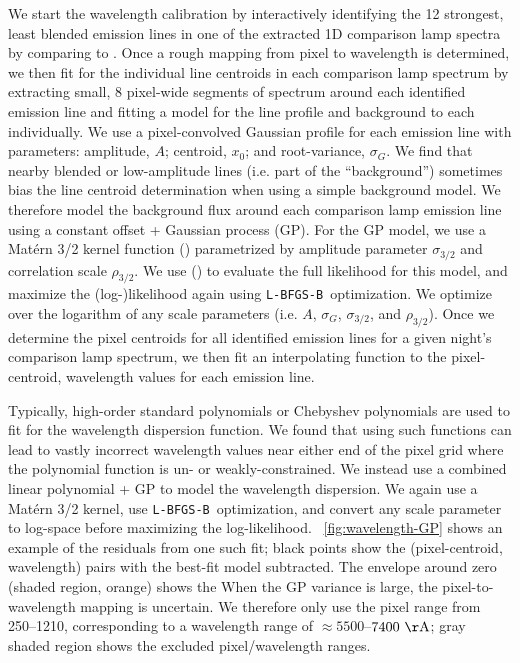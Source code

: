 \documentclass[modern, letterpaper]{aastex61}
\newcommand{\lbfgsb}{\texttt{L-BFGS-B}}
\begin{document}
We start the wavelength calibration by interactively identifying the 12
strongest, least blended emission lines in one of the extracted 1D comparison
lamp spectra by comparing to .
Once a rough mapping from pixel to wavelength is determined, we then fit for
the individual line centroids in each comparison lamp spectrum by extracting
small, 8 pixel-wide segments of spectrum around each identified emission line
and fitting a model for the line profile and background to each individually.
We use a pixel-convolved Gaussian profile for each emission line with
parameters: amplitude, $A$; centroid, $x_0$; and root-variance, $\sigma_G$.
We find that nearby blended or low-amplitude lines (i.e. part of the
``background'') sometimes bias the line centroid determination when using a
simple background model.
We therefore model the background flux around each comparison lamp emission
line using a constant offset + Gaussian process (GP).
For the GP model, we use a Mat\'ern 3/2 kernel function
(\citealt{Matern:1986,Rasmussen:2005}) parametrized by amplitude parameter
$\sigma_{3/2}$ and correlation scale $\rho_{3/2}$.
We use  (\citealt{Foreman-Mackey:2017}) to evaluate the full
likelihood for this model, and maximize the (log-)likelihood again using
\lbfgsb\ optimization.
We optimize over the logarithm of any scale parameters (i.e. $A$, $\sigma_G$,
$\sigma_{3/2}$, and $\rho_{3/2}$).
Once we determine the pixel centroids for all identified emission lines for a
given night's comparison lamp spectrum, we then fit an interpolating function
to the pixel-centroid, wavelength values for each emission line.

Typically, high-order standard polynomials or Chebyshev polynomials are used to
fit for the wavelength dispersion function.
We found that using such functions can lead to vastly incorrect wavelength
values near either end of the pixel grid where the polynomial function is
un- or weakly-constrained.
We instead use a combined linear polynomial + GP to model the wavelength
dispersion.
We again use a Mat\'ern 3/2 kernel, use \lbfgsb\ optimization, and convert any
scale parameter to log-space before maximizing the log-likelihood.
\figurename~\ref{fig:wavelength-GP} shows an example of the residuals from one
such fit; black points show the (pixel-centroid, wavelength) pairs with the
best-fit model subtracted.
The envelope around zero (shaded region, orange) shows the 
When the GP variance is large, the pixel-to-wavelength mapping is uncertain.
We therefore only use the pixel range from 250--1210, corresponding to a
wavelength range of $\approx 5500$--$7400~{\rm \AA}$; gray shaded region shows
the excluded pixel/wavelength ranges.
\end{document}

